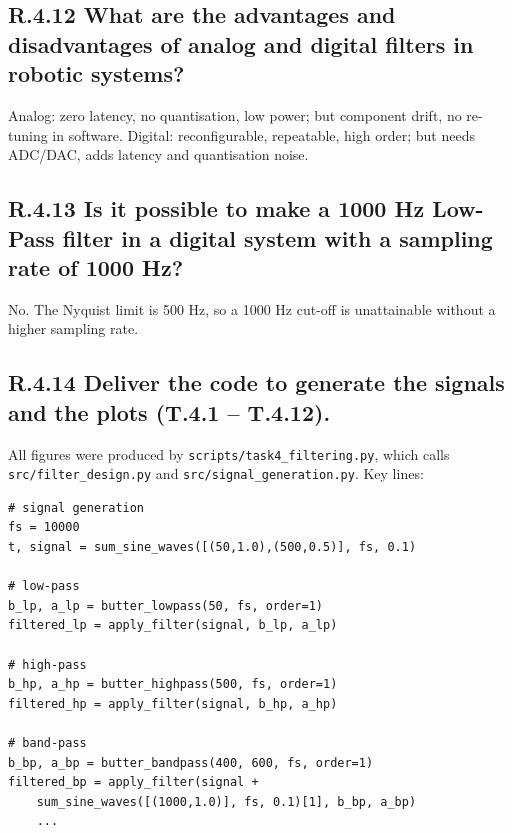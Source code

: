 \documentclass{article}
\begin{document}
\subsection*{R.4.12 What are the advantages and disadvantages of analog and digital filters in robotic systems?}

Analog: zero latency, no quantisation, low power; but component drift, no re-tuning in software.  
Digital: reconfigurable, repeatable, high order; but needs ADC/DAC, adds latency and quantisation noise.

\subsection*{R.4.13 Is it possible to make a 1000 Hz Low-Pass filter in a digital system with a sampling rate of 1000 Hz?}

No.  The Nyquist limit is 500 Hz, so a 1000 Hz cut-off is unattainable without a higher sampling rate.

\subsection*{R.4.14 Deliver the code to generate the signals and the plots (T.4.1 – T.4.12).}

All figures were produced by \texttt{scripts/task4\_filtering.py}, which calls
\texttt{src/filter\_design.py} and \texttt{src/signal\_generation.py}.  
Key lines:

\begin{verbatim}
# signal generation
fs = 10000
t, signal = sum_sine_waves([(50,1.0),(500,0.5)], fs, 0.1)

# low-pass
b_lp, a_lp = butter_lowpass(50, fs, order=1)
filtered_lp = apply_filter(signal, b_lp, a_lp)

# high-pass
b_hp, a_hp = butter_highpass(500, fs, order=1)
filtered_hp = apply_filter(signal, b_hp, a_hp)

# band-pass
b_bp, a_bp = butter_bandpass(400, 600, fs, order=1)
filtered_bp = apply_filter(signal + 
    sum_sine_waves([(1000,1.0)], fs, 0.1)[1], b_bp, a_bp)
    ...
\end{verbatim}



\end{document}
